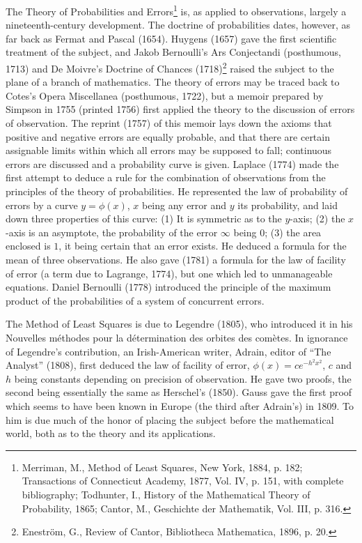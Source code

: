 \documentclass[oneside]{book}
\begin{document}
{The Theory of Probabilities and Errors\footnote{Merriman, M., Method
of Least Squares, New York, 1884, p. 182; Transactions of
Connecticut Academy, 1877, Vol. IV, p. 151, with complete
bibliography; Todhunter, I., History of the Mathematical Theory of
Probability, 1865; Cantor, M., Geschichte der Mathematik, Vol. III,
p. 316.} is, as applied to observations, largely a
nineteenth-century development. The doctrine of probabilities dates,
however, as far back as Fermat and Pascal (1654). Huygens (1657)
gave the first scientific treatment of the subject, and Jakob
Bernoulli's Ars Conjectandi (posthumous, 1713) and De Moivre's
Doctrine of Chances (1718)\footnote{Enestr\"om, G., Review of
Cantor, Bibliotheca Mathematica, 1896, p. 20.} raised the subject
to the plane of a branch of mathematics. The theory of errors may
be traced back to Cotes's Opera Miscellanea (posthumous, 1722), but
a memoir prepared by Simpson in 1755 (printed 1756) first applied
the theory to the discussion of errors of observation. The reprint
(1757) of this memoir lays down the axioms that positive and
negative errors are equally probable, and that there are certain
assignable limits within which all errors may be supposed to fall;
continuous errors are discussed and a probability curve is given.
Laplace (1774) made the first attempt to deduce a rule for the
combination of observations from the principles of the theory of
probabilities. He represented the law of probability of errors by a
curve $y = \phi(x)$, $x$ being any error and $y$ its probability,
and laid down three properties of this curve: (1) It is symmetric as
to the $y$-axis; (2) the $x$-axis is an asymptote, the probability
of the error $\infty$ being $0$; (3) the area enclosed is $1$, it
being certain that an error exists. He deduced a formula for the
mean of three observations. He also gave (1781) a formula for the
law of facility of error (a term due to Lagrange, 1774), but one
which led to unmanageable equations. Daniel Bernoulli (1778)
introduced the principle of the maximum product of the probabilities
of a system of concurrent errors.

The Method of Least Squares is due to Legendre (1805), who
introduced it in his Nouvelles m\'ethodes pour la d\'etermination
des orbites des com\`etes. In ignorance of Legendre's contribution,
an Irish-American writer, Adrain, editor of ``The Analyst'' (1808),
first deduced the law of facility of error, $\phi(x) = ce^{-h^2
x^2}$, $c$ and $h$ being constants depending on precision of
observation. He gave two proofs, the second being essentially the
same as Herschel's (1850). Gauss gave the first proof which seems to
have been known in Europe (the third after Adrain's) in 1809. To him
is due much of the honor of placing the subject before the
mathematical world, both as to the theory and its applications.

}
\end{document}
